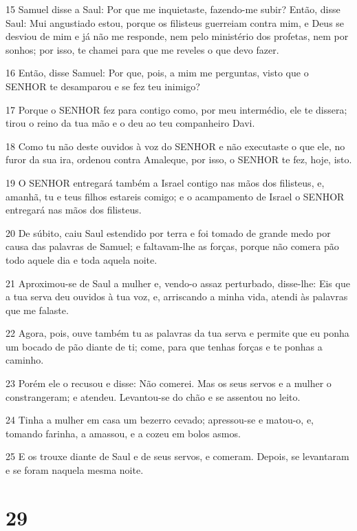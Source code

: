 \par 15 Samuel disse a Saul: Por que me inquietaste, fazendo-me subir? Então, disse Saul: Mui angustiado estou, porque os filisteus guerreiam contra mim, e Deus se desviou de mim e já não me responde, nem pelo ministério dos profetas, nem por sonhos; por isso, te chamei para que me reveles o que devo fazer.
\par 16 Então, disse Samuel: Por que, pois, a mim me perguntas, visto que o SENHOR te desamparou e se fez teu inimigo?
\par 17 Porque o SENHOR fez para contigo como, por meu intermédio, ele te dissera; tirou o reino da tua mão e o deu ao teu companheiro Davi.
\par 18 Como tu não deste ouvidos à voz do SENHOR e não executaste o que ele, no furor da sua ira, ordenou contra Amaleque, por isso, o SENHOR te fez, hoje, isto.
\par 19 O SENHOR entregará também a Israel contigo nas mãos dos filisteus, e, amanhã, tu e teus filhos estareis comigo; e o acampamento de Israel o SENHOR entregará nas mãos dos filisteus.
\par 20 De súbito, caiu Saul estendido por terra e foi tomado de grande medo por causa das palavras de Samuel; e faltavam-lhe as forças, porque não comera pão todo aquele dia e toda aquela noite.
\par 21 Aproximou-se de Saul a mulher e, vendo-o assaz perturbado, disse-lhe: Eis que a tua serva deu ouvidos à tua voz, e, arriscando a minha vida, atendi às palavras que me falaste.
\par 22 Agora, pois, ouve também tu as palavras da tua serva e permite que eu ponha um bocado de pão diante de ti; come, para que tenhas forças e te ponhas a caminho.
\par 23 Porém ele o recusou e disse: Não comerei. Mas os seus servos e a mulher o constrangeram; e atendeu. Levantou-se do chão e se assentou no leito.
\par 24 Tinha a mulher em casa um bezerro cevado; apressou-se e matou-o, e, tomando farinha, a amassou, e a cozeu em bolos asmos.
\par 25 E os trouxe diante de Saul e de seus servos, e comeram. Depois, se levantaram e se foram naquela mesma noite.

\chapter{29}

